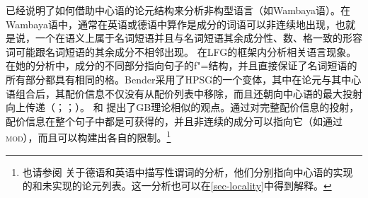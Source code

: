  \citet{Bender2008a}\label{Seite-Bender-Wambaya}已经说明了如何借助中心语的论元结构来分析非构型语言（如Wambaya语）。在Wambaya语中，通常在英语或德语中算作是成分的词语可以非连续地出现，也就是说，一个在语义上属于名词短语并且与名词短语其余成分性、数、格一致的形容词可能跟名词短语的其余成分不相邻出现。 \citet{Nordlinger98a-u}在LFG\indexlfgc 的框架内分析相关语言现象。在她的分析中，成分的不同部分指向句子的f"=结构，并且直接保证了名词短语的所有部分都具有相同的格。Bender采用了HPSG的一个变体，其中在论元与其中心语组合后，其配价信息不仅没有从配价列表中移除，而且还朝向中心语的最大投射向上传递（\citealp{Meurers99b}；\citealp{Prze99}；\citealp[\S~17.4]{MuellerLehrbuch1}）。 \citet[]{Higginbotham85a}和 \citet{Winkler97a}提出了GB理论相似的观点。通过对完整配价信息的投射，配价信息在整个句子中都是可获得的，并且非连续的成分可以指向它（如通过\textsc{mod}），而且可以构建出各自的限制。\footnote{%
也请参阅 关于德语和英语中描写性谓词的分析，他们分别指向中心语的实现的和未实现的论元列表。这一分析也可以在\ref{sec-locality}中得到解释。
}  
